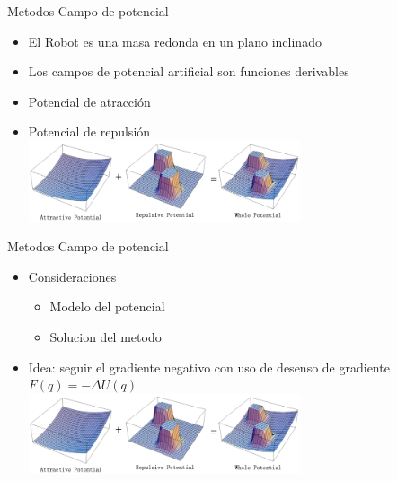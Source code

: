 \documentclass[
	11pt, %
]{beamer}
\begin{document}
\begin{frame}{Metodos Campo de potencial}
  \begin{itemize}
  \item El Robot es una masa redonda en un plano inclinado \\
  \item Los campos de potencial artificial son funciones derivables\\
  \item Potencial de atracción\\
  \item Potencial de repulsión\\
    \centering
    \bigskip %
    \includegraphics[width=8cm]{potential-field1_robot.jpg}
  \end{itemize}
\end{frame}

\begin{frame}{Metodos Campo de potencial}
  \begin{itemize}
  \item Consideraciones\\
    \begin{itemize}
    \item Modelo del potencial
    \item Solucion del metodo
    \end{itemize}
  \item Idea: seguir el gradiente negativo con uso de desenso de gradiente\\
    \centering
    $F(q)=-\Delta U(q)$\\
    \bigskip %
    \includegraphics[width=8cm]{potential-field1_robot.jpg}
  \end{itemize}
\end{frame}
\end{document}
